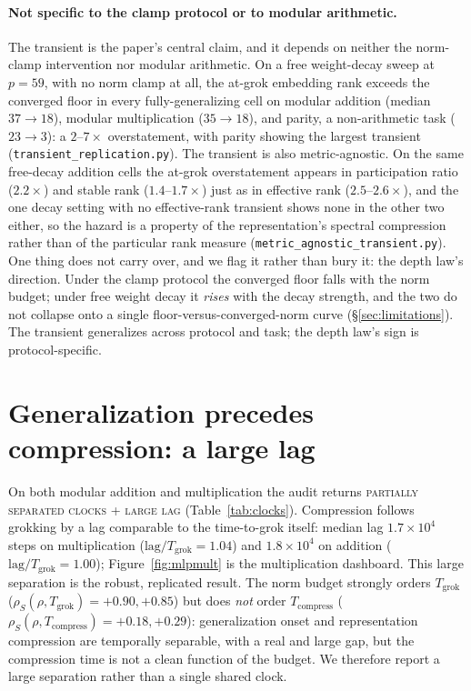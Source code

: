 \documentclass[11pt]{article}
\begin{document}
\paragraph{Not specific to the clamp protocol or to modular arithmetic.} The transient is the paper's
central claim, and it depends on neither the norm-clamp intervention nor modular arithmetic. On a
free weight-decay sweep at $p=59$, with no norm clamp at all, the at-grok embedding rank exceeds
the converged floor in every fully-generalizing cell on modular addition (median $37\!\to\!18$),
modular multiplication ($35\!\to\!18$), and parity, a non-arithmetic task ($23\!\to\!3$): a
$2$--$7\times$ overstatement, with parity showing the largest transient (\texttt{transient\_replication.py}).
The transient is also metric-agnostic. On the same free-decay addition cells the at-grok
overstatement appears in participation ratio ($2.2\times$) and stable rank ($1.4$--$1.7\times$) just as in
effective rank ($2.5$--$2.6\times$), and the one decay setting with no effective-rank transient shows none
in the other two either, so the hazard is a property of the representation's spectral compression rather than
of the particular rank measure (\texttt{metric\_agnostic\_transient.py}).
One thing does not carry over, and we flag it rather than bury it: the depth law's direction.
Under the clamp protocol the converged floor falls with the norm budget; under free weight decay it
\emph{rises} with the decay strength, and the two do not collapse onto a single floor-versus-converged-norm
curve (\S\ref{sec:limitations}). The transient generalizes across protocol and task; the depth law's sign
is protocol-specific.

\section{Generalization precedes compression: a large lag}
On both modular addition and multiplication the audit returns \textsc{partially separated clocks + large
lag} (Table~\ref{tab:clocks}). Compression follows grokking by a lag comparable to the time-to-grok
itself: median lag $1.7\times10^4$ steps on multiplication ($\mathrm{lag}/T_{\mathrm{grok}}=1.04$) and
$1.8\times10^4$ on addition ($\mathrm{lag}/T_{\mathrm{grok}}=1.00$); Figure~\ref{fig:mlpmult} is the
multiplication dashboard. This large separation is the robust,
replicated result. The norm budget strongly orders $T_{\mathrm{grok}}$
($\rho_S(\rho,T_{\mathrm{grok}})=+0.90,+0.85$) but does \emph{not} order $T_{\mathrm{compress}}$
($\rho_S(\rho,T_{\mathrm{compress}})=+0.18,+0.29$): generalization onset and representation compression
are temporally separable, with a real and large gap, but the compression time is not a clean function of
the budget. We therefore report a large separation rather than a single shared clock.
\end{document}
